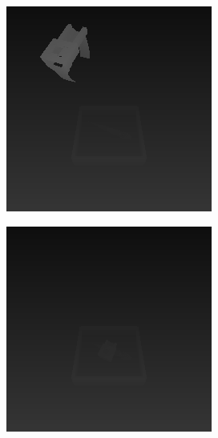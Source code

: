 \begin{figure}
\centering
\begin{subfigure}[t]{0.33\textwidth}
\centering
\includegraphics[width=\linewidth]{figures/simulation/depth-in}
\end{subfigure}%
    \hfill
\begin{subfigure}[t]{0.33\textwidth}
\centering
\includegraphics[width=\linewidth]{figures/simulation/depth-grabbing}

\end{subfigure}
\end{figure}
